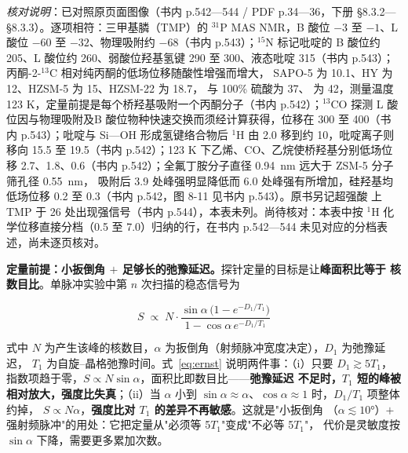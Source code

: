 \emph{核对说明}：已对照原页面图像（书内 p.542—544 / PDF p.34—36，下册 §8.3.2—§8.3.3）。逐项相符：三甲基膦（TMP）的 $^{31}$P MAS NMR，B 酸位 $-3$ 至 $-1$、L 酸位 $-60$
至 $-32$、物理吸附约 $-68$（书内 p.543）；$^{15}$N 标记吡啶的 B 酸位约 205、L 酸位约
260、弱酸位羟基氢键 290 至 300、液态吡啶 315（书内 p.543）；丙酮-2-$^{13}$C 相对纯丙酮的低场位移随酸性增强而增大，
SAPO-5 为 10.1、HY 为 12、HZSM-5 为 15、HZSM-22 为 18.7，
与 100\% 硫酸为 37、 为 42，测量温度 123 K，定量前提是每个桥羟基吸附一个丙酮分子（书内
p.542）；$^{13}$CO 探测 L 酸位因与物理吸附及B 酸位物种快速交换而须经计算获得，位移在 300 至
400（书内 p.543）；吡啶与 Si—OH 形成氢键络合物后 $^{1}$H 由 2.0 移到约 10，吡啶离子则移向
15.5 至 19.5（书内 p.542）；123 K 下乙烯、CO、乙烷使桥羟基分别低场位移 2.7、1.8、0.6（书内
p.542）；全氟丁胺分子直径 \qty{0.94}{nm} 远大于 ZSM-5 分子筛孔径 \qty{0.55}{nm}，
吸附后 3.9 处峰强明显降低而 6.0 处峰强有所增加，硅羟基均低场位移 0.2 至 0.3（书内 p.542，图
8-11 见书内 p.543）。原书另记超强酸  上 TMP 于 26 处出现强信号（书内
p.544），本表未列。尚待核对：本表中按 $^{1}$H 化学位移直接分档（0.5 至 7.0）归纳的行，在书内
p.542—544 未见对应的分档表述，尚未逐页核对。


\begin{principle}
\textbf{定量前提：小扳倒角 $+$ 足够长的弛豫延迟。}探针定量的目标是让\textbf{峰面积比等于
核数目比}。单脉冲实验中第 $n$ 次扫描的稳态信号为

\begin{equation}
\label{eq:ernst}
S\;\propto\;N\cdot\frac{\sin\alpha\,\bigl(1-e^{-D_1/T_1}\bigr)}
{1-\cos\alpha\,e^{-D_1/T_1}}
\end{equation}

式中 $N$ 为产生该峰的核数目，$\alpha$ 为扳倒角（射频脉冲宽度决定），$D_1$ 为弛豫延迟，
$T_1$ 为自旋--晶格弛豫时间。式~\eqref{eq:ernst} 说明两件事：（i）只要
$D_1\gtrsim5T_1$，指数项趋于零，$S\propto N\sin\alpha$，面积比即数目比——\textbf{弛豫延迟
不足时，$T_1$ 短的峰被相对放大，强度比失真}；（ii）当 $\alpha$ 小到
$\sin\alpha\approx\alpha$、$\cos\alpha\approx1$ 时，$D_1/T_1$ 项整体约掉，
$S\propto N\alpha$，\textbf{强度比对 $T_1$ 的差异不再敏感}。这就是"小扳倒角
（$\alpha\lesssim10°$）$+$ 强射频脉冲"的用处：它把定量从"必须等 5$T_1$"变成"不必等 5$T_1$"，
代价是灵敏度按 $\sin\alpha$ 下降，需要更多累加次数。
\end{principle}


